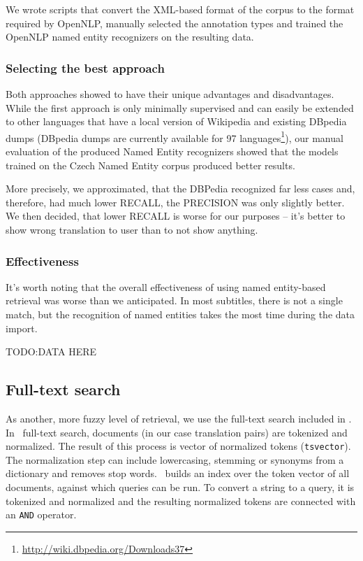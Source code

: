 We wrote scripts that convert the XML-based format of the corpus to the format required by OpenNLP, 
manually selected the annotation types and trained the OpenNLP named entity recognizers on the resulting data.


\subsubsection*{Selecting the best approach}

Both approaches showed to have their unique advantages and disadvantages. While the first approach is 
only minimally supervised and can easily be extended to other languages that have a local version of 
Wikipedia and existing DBpedia dumps (DBpedia dumps are currently available for 97 languages\footnote{\url{http://wiki.dbpedia.org/Downloads37}}), 
our manual evaluation of the produced Named Entity recognizers showed that the 
models trained on the Czech Named Entity corpus produced better results.

More precisely, we approximated, that the DBPedia recognized far less cases and, therefore, had much lower RECALL, the PRECISION was only slightly better. We then decided, that lower RECALL is worse for our purposes -- it's better to show wrong translation to user than to not show anything.

\subsubsection*{Effectiveness}
It's worth noting that the overall effectiveness of using named entity-based retrieval was worse than we anticipated. In most subtitles, there is not a single match, but the recognition of named entities takes the most time during the data import.  

TODO:\todo{!!}DATA HERE


\subsection{Full-text search}

As another, more fuzzy level of retrieval, we use the full-text search included in \postgres. In  \postgres~full-text search, documents (in our case translation pairs) are tokenized and normalized. The result of this process is vector of normalized tokens ({\tt tsvector}). The normalization step can include lowercasing, stemming or synonyms from a dictionary and removes stop words. \postgres~builds an index over the token vector of all documents, against which queries can be run. To convert a string to a query, it is tokenized and normalized and the resulting normalized tokens are connected with an {\tt AND} operator.

